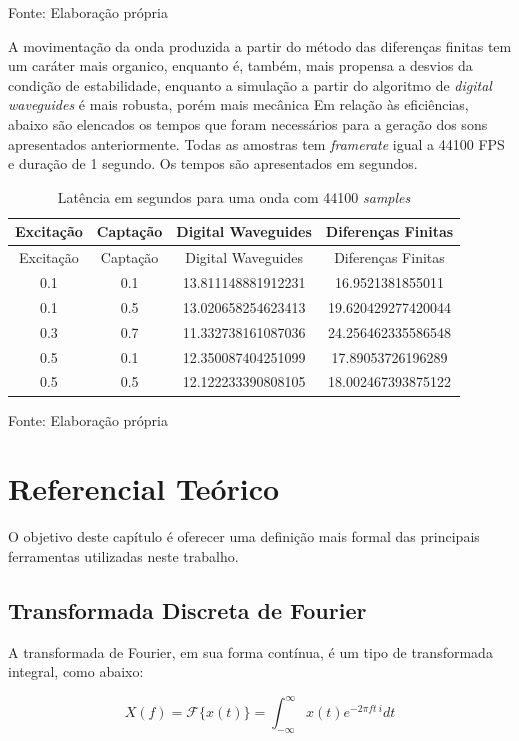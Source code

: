 \documentclass[]{article}
\begin{document}
Fonte: Elaboração própria

A movimentação da onda produzida a partir do método das diferenças
finitas tem um caráter mais organico, enquanto é, também, mais propensa
a desvios da condição de estabilidade, enquanto a simulação a partir do
algoritmo de \emph{digital waveguides} é mais robusta, porém mais
mecânica Em relação às eficiências, abaixo são elencados os tempos que
foram necessários para a geração dos sons apresentados anteriormente.
Todas as amostras tem \emph{framerate} igual a 44100 FPS e duração de 1
segundo. Os tempos são apresentados em segundos.

\begin{longtable}[]{@{}cccc@{}}
\caption{Latência em segundos para uma onda com 44100 \emph{samples}
\label{tbl:wavexdiff}}\tabularnewline
\toprule
Excitação & Captação & Digital Waveguides & Diferenças
Finitas\tabularnewline
\midrule
\endfirsthead
\toprule
Excitação & Captação & Digital Waveguides & Diferenças
Finitas\tabularnewline
\midrule
\endhead
0.1 & 0.1 & 13.811148881912231 & 16.9521381855011\tabularnewline
0.1 & 0.5 & 13.020658254623413 & 19.620429277420044\tabularnewline
0.3 & 0.7 & 11.332738161087036 & 24.256462335586548\tabularnewline
0.5 & 0.1 & 12.350087404251099 & 17.89053726196289\tabularnewline
0.5 & 0.5 & 12.122233390808105 & 18.002467393875122\tabularnewline
\bottomrule
\end{longtable}

Fonte: Elaboração própria

\hypertarget{referencial-teuxf3rico}{%
\section{Referencial Teórico}\label{referencial-teuxf3rico}}

O objetivo deste capítulo é oferecer uma definição mais formal das
principais ferramentas utilizadas neste trabalho.

\hypertarget{transformada-discreta-de-fourier}{%
\subsection{Transformada Discreta de
Fourier}\label{transformada-discreta-de-fourier}}

A transformada de Fourier, em sua forma contínua, é um tipo de
transformada integral, como abaixo:

\begin{equation}
X(f) = \mathcal{F}\{x(t)\}=\int_{-\infty}^\infty x(t) e^{- 2 \pi f t \ i} dt
\label{eq:id}\end{equation}
\end{document}
